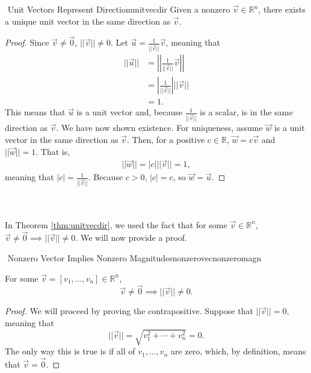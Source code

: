     \begin{theorem}{\Stop\,\,Unit Vectors Represent Direction}{unitvecdir}
        Given a nonzero \(\vec{v}\in\mathbb{R}^n\), there exists a unique unit vector in the same direction as \(\vec{v}\).
        \begin{proof}
            Since \(\vec{v}\neq\vec{0}\), \(||\vec{v}||\neq0\). %
            Let \(\vec{u}=\frac{1}{||\vec{v}||}\vec{v}\), meaning that
            \begin{align*}
                ||\vec{u}||&=\left|\left|\frac{1}{||\vec{v}||}\vec{v}\right|\right| \\
                &=\left|\frac{1}{||\vec{v}||}\right|||\vec{v}|| \\
                &=1.
            \end{align*}
            This means that \(\vec{u}\) is a unit vector and, because \(\frac{1}{||\vec{v}||}\) is a scalar, is in the same direction as \(\vec{v}\). We have now shown existence. For uniqueness, assume \(\vec{w}\) is a unit vector in the same direction as \(\vec{v}\). Then, for a positive \(c\in\mathbb{R}\), \(\vec{w}=c\vec{v}\) and \(||\vec{w}||=1\). That is,
            \begin{align*}
                ||\vec{w}||=|c|||\vec{v}||=1,
            \end{align*}
            meaning that \(|c|=\frac{1}{||\vec{v}||}\). Because \(c>0\), \(|c|=c\), so \(\vec{w}=\vec{u}\).
        \end{proof}
    \end{theorem}
    \pagebreak
    \vphantom
    \\
    \\
    In Theorem \ref{thm:unitvecdir}, we used the fact that for some \(\vec{v}\in\mathbb{R}^n\), \(\vec{v}\neq\vec{0}\implies||\vec{v}||\neq0\). We will now provide a proof.
    \begin{theorem}{\Stop\,\,Nonzero Vector Implies Nonzero Magnitudes}{nonzerovecnonzeromagn}

        For some \(\vec{v}=[v_1,\ldots,v_n]\in\mathbb{R}^n\), 
        \begin{equation*}
            \vec{v}\neq\vec{0}\implies||\vec{v}||\neq0.
        \end{equation*}
        \begin{proof}
            We will proceed by proving the contrapositive. Suppose that \(||\vec{v}||=0\), meaning that
            \begin{equation*}
                ||\vec{v}||=\sqrt{v_1^2+\cdots+v_n^2}=0.
            \end{equation*}
            The only way this is true is if all of \(v_1,\ldots,v_n\) are zero, which, by definition, means that \(\vec{v}=\vec{0}\).
        \end{proof}
        
    \end{theorem}
    

